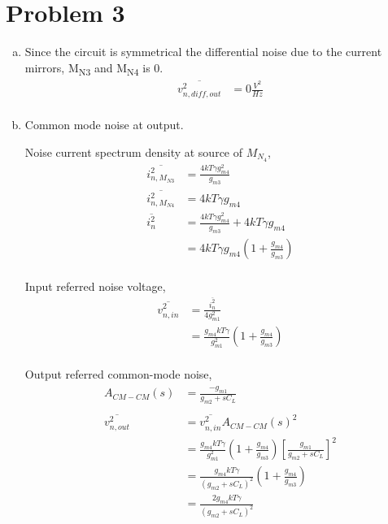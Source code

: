\documentclass{article}
\begin{document}
\section{Problem 3}
\label{sec:org1eaf60e}

\begin{enumerate}[(a)]
\item Since the circuit is symmetrical the differential noise due to the current mirrors, M\textsubscript{N3} and M\textsubscript{N4}
is 0.
\begin{equation*}
\begin{aligned}
\overline{v_{n, diff, out}^2} &= 0 \frac{V^{2}}{Hz} \\
\end{aligned}
\end{equation*}

\item Common mode noise at output.

Noise current spectrum density at source of \(M_{N_{4}}\),
\begin{equation*}
\begin{aligned}
\overline{i_{n, M_{N3}}^2} &= \frac{4kT\gamma{}g_{m4}^{2}}{g_{m3}} \\
\overline{i_{n, M_{N4}}^2} &= 4kT\gamma{}g_{m4} \\
\overline{i_{n}^{2}} &= \frac{4kT\gamma{}g_{m4}^{2}}{g_{m3}} + 4kT\gamma{}g_{m4} \\
&= 4kT\gamma{}g_{m4}(1 + \frac{g_{m4}}{g_{m3}}) \\
\end{aligned}
\end{equation*}

Input referred noise voltage,
\begin{equation*}
\begin{aligned}
\overline{v_{n, in}^{2}} &= \frac{\overline{i_{n}^{2}}}{4g_{m1}^{2}} \\
&= \frac{g_{m4}kT\gamma{}}{g_{m1}^{2}}(1 + \frac{g_{m4}}{g_{m3}}) \\
\end{aligned}
\end{equation*}

Output referred common-mode noise,
\begin{equation*}
\begin{aligned}
A_{CM-CM}(s) &= \frac{-g_{m1}}{g_{m2} + sC_{L}} \\
\\
\overline{v_{n, out}^{2}} &= \overline{v_{n, in}^{2}} A_{CM-CM}(s)^2 \\
&= \frac{g_{m4}kT\gamma{}}{g_{m1}^{2}}(1 + \frac{g_{m4}}{g_{m3}})[\frac{g_{m1}}{g_{m2} + sC_{L}}]^{2} \\
&= \frac{g_{m4}kT\gamma{}}{(g_{m2} + sC_{L})^{2}}(1 + \frac{g_{m4}}{g_{m3}}) \\
&= \frac{2g_{m4}kT\gamma{}}{(g_{m2} + sC_{L})^{2}} \\
\end{aligned}
\end{equation*}


\end{enumerate}
\end{document}

